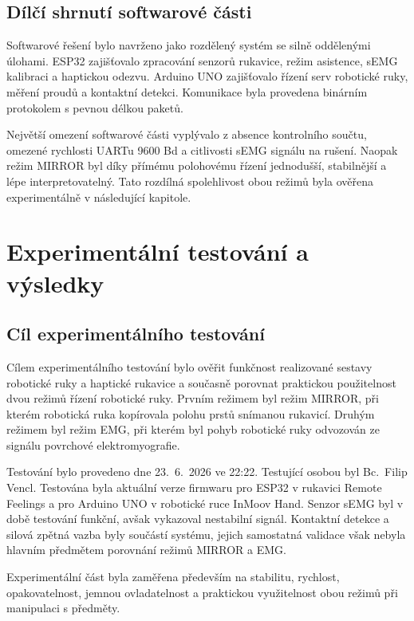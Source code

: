 \section{Dílčí shrnutí softwarové části}
\label{sec:shrnuti-software}

Softwarové řešení bylo navrženo jako rozdělený systém se silně oddělenými úlohami. ESP32 zajišťovalo zpracování senzorů rukavice, režim asistence, sEMG kalibraci a haptickou odezvu. Arduino UNO zajišťovalo řízení serv robotické ruky, měření proudů a kontaktní detekci. Komunikace byla provedena binárním protokolem s pevnou délkou paketů.

Největší omezení softwarové části vyplývalo z absence kontrolního součtu, omezené rychlosti UARTu 9600 Bd a citlivosti sEMG signálu na rušení. Naopak režim MIRROR byl díky přímému polohovému řízení jednodušší, stabilnější a lépe interpretovatelný. Tato rozdílná spolehlivost obou režimů byla ověřena experimentálně v následující kapitole.

\chapter{Experimentální testování a výsledky}
\label{chap:experimentalni-testovani}

\section{Cíl experimentálního testování}
\label{sec:cil-testovani}

Cílem experimentálního testování bylo ověřit funkčnost realizované sestavy robotické ruky a haptické rukavice a současně porovnat praktickou použitelnost dvou režimů řízení robotické ruky. Prvním režimem byl režim MIRROR, při kterém robotická ruka kopírovala polohu prstů snímanou rukavicí. Druhým režimem byl režim EMG, při kterém byl pohyb robotické ruky odvozován ze signálu povrchové elektromyografie.

Testování bylo provedeno dne 23.~6.~2026 ve 22:22. Testující osobou byl Bc.~Filip Vencl. Testována byla aktuální verze firmwaru pro ESP32 v rukavici Remote Feelings a pro Arduino UNO v robotické ruce InMoov Hand. Senzor sEMG byl v době testování funkční, avšak vykazoval nestabilní signál. Kontaktní detekce a silová zpětná vazba byly součástí systému, jejich samostatná validace však nebyla hlavním předmětem porovnání režimů MIRROR a EMG\@.

Experimentální část byla zaměřena především na stabilitu, rychlost, opakovatelnost, jemnou ovladatelnost a praktickou využitelnost obou režimů při manipulaci s předměty.

